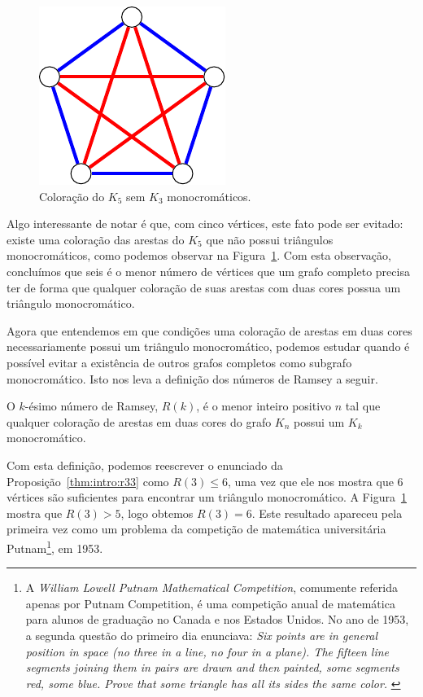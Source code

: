 \begin{figure}[ht!]
\centering
\includegraphics{figures/1_intro_5_pentagram}
\caption{Coloração do $K_5$ sem $K_3$ monocromáticos.}
\label{fig:intro:r33lb}
\end{figure}

Algo interessante de notar é que, com cinco vértices, este fato pode ser evitado: existe uma coloração das arestas do $K_5$ que não possui triângulos monocromáticos, como podemos observar na Figura~\ref{fig:intro:r33lb}. Com esta observação, concluímos que seis é o menor número de vértices que um grafo completo precisa ter de forma que qualquer coloração de suas arestas com duas cores possua um triângulo monocromático.

Agora que entendemos em que condições uma coloração de arestas em duas cores necessariamente possui um triângulo monocromático, podemos estudar quando é possível evitar a existência de outros grafos completos como subgrafo monocromático. Isto nos leva a definição dos números de Ramsey a seguir.

\begin{definition}
O $k$-ésimo número de Ramsey, $R(k)$, é o menor inteiro positivo $n$ tal que qualquer coloração de arestas em duas cores do grafo $K_n$ possui um $K_k$ monocromático.
\end{definition}

Com esta definição, podemos reescrever o enunciado da Proposição~\ref{thm:intro:r33} como $R(3) \leq 6$, uma vez que ele nos mostra que 6 vértices são suficientes para encontrar um triângulo monocromático.  A Figura~\ref{fig:intro:r33lb} mostra que $R(3) > 5$, logo obtemos $R(3) = 6$. Este resultado apareceu pela primeira vez como um problema da competição de matemática universitária Putnam\footnote{A \emph{William Lowell Putnam Mathematical Competition}, comumente referida apenas por Putnam Competition, é uma competição anual de matemática para alunos de graduação no Canada e nos Estados Unidos. No ano de 1953, a segunda questão do primeiro dia enunciava:
\emph{Six points are in general position in space (no three in a line, no four in a plane). The fifteen line segments joining them in pairs are drawn and then painted, some segments red, some blue. Prove that some triangle has all its sides the same color.} \cite{putnam}}, em 1953.

